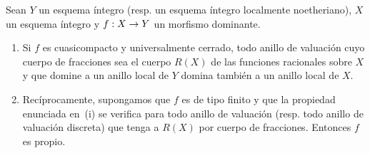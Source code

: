 \documentclass[oneside,10pt]{amsart}
\makeatletter
\newcommand{\ega@arrow}[2]{\mathchoice{#1}{#2}{#2}{#2}}
\renewcommand{\to}{\ega@arrow{\longrightarrow}{\rightarrow}}
\let\EGAOriginalLabel\label
\renewcommand{\label}[1]{\phantomsection\EGAOriginalLabel{#1}}
\makeatother
\begin{document}

\begin{corollary}[7.3.10]
\label{II.7.3.10-fr}
Sean $Y$ un esquema íntegro \textup{(resp.} un esquema íntegro localmente noetheriano), $X$ un esquema íntegro y $f:X\to Y$ un morfismo dominante.
\begin{enumerate}
  \item[\rm{(i)}] Si $f$ es cuasicompacto y universalmente cerrado, todo anillo de valuación cuyo cuerpo de fracciones sea el cuerpo $R(X)$ de las funciones racionales sobre $X$ y que domine a un anillo local de $Y$ domina también a un anillo local de $X$.
  \item[\rm{(ii)}] Recíprocamente, supongamos que $f$ es de tipo finito y que la propiedad enunciada en~\textup{(i)} se verifica para todo anillo de valuación \textup{(resp.} todo anillo de valuación discreta) que tenga a $R(X)$ por cuerpo de fracciones.
  Entonces $f$ es propio.
\end{enumerate}
\end{corollary}
\end{document}
